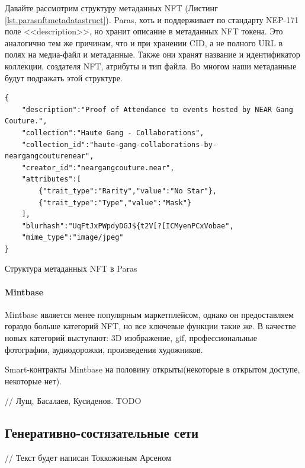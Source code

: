 Давайте рассмотрим структуру метаданных NFT (Листинг {\color{blue}\ref{lst.parasnftmetadatastruct}}). Paras, хоть и поддерживает по стандарту NEP-171 поле <<description>>, но хранит описание в метаданных NFT токена. Это аналогично тем же причинам, что и при хранении CID, а не полного URL в полях на медиа-файл и метаданные. Также они хранят название и идентификатор коллекции, создателя NFT, атрибуты и тип файла. Во многом наши метаданные будут подражать этой структуре.

\begin{listing}[H]
\begin{verbatim}
{
    "description":"Proof of Attendance to events hosted by NEAR Gang Couture.",
    "collection":"Haute Gang - Collaborations",
    "collection_id":"haute-gang-collaborations-by-neargangcouturenear",
    "creator_id":"neargangcouture.near",
    "attributes":[
        {"trait_type":"Rarity","value":"No Star"},
        {"trait_type":"Type","value":"Mask"}
    ],
    "blurhash":"UqFtJxPWpdyDGJ${t2V[?[ICMyenPCxVobae",
    "mime_type":"image/jpeg"
}
\end{verbatim}
\caption{Структура метаданных NFT в Paras}
\label{lst.parasnftmetadatastruct}
\end{listing}


\paragraph{Mintbase}

Mintbase является менее популярным маркетплейсом, однако он предоставляем гораздо больше категорий NFT, но все ключевые функции такие же. В качестве новых категорий выступают: 3D изображение, gif, профессиональные фотографии, аудиодорожки, произведения художников.

Smart-контракты Mintbase на половину открыты(некоторые в открытом доступе, некоторые нет)\cite{mintbasecontracts}.

// Лущ, Басалаев, Кусиденов. TODO

\subsection{Генеративно-состязательные сети}

// Текст будет написан Токкожиным Арсеном
